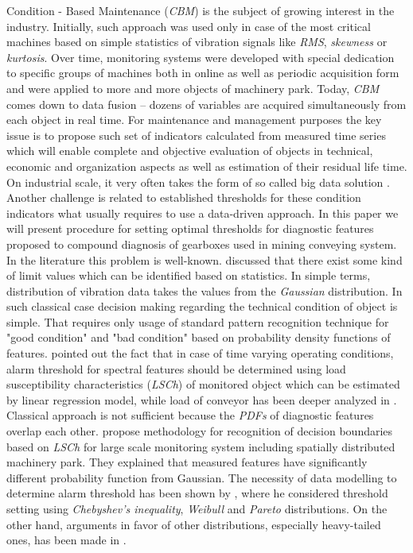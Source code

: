 \documentclass[10pt]{article}
\begin{document}
Condition - Based Maintenance (\textit{CBM}) is the subject of growing interest in the industry. Initially, such approach was used only in case of the most critical machines based on simple statistics of vibration signals like \textit{RMS}, \textit{skewness} or \textit{kurtosis}. Over time, monitoring systems were developed with special dedication to specific groups of machines both in online as well as periodic acquisition form and were applied to more and more objects of machinery park. Today, \textit{CBM} comes down to data fusion -- dozens of variables are acquired simultaneously from each object in real time. For maintenance and management purposes the key issue is to propose such set of indicators calculated from measured time series which will enable complete and objective evaluation of objects in technical, economic and organization aspects as well as estimation of their residual life time. On industrial scale, it very often takes the form of so called big data solution \cite{bartkowiak2014dimensionality}. Another challenge is related to established thresholds for these condition indicators what usually requires to use a data-driven approach. In this paper we will present procedure for setting optimal thresholds for diagnostic features proposed to compound diagnosis of gearboxes used in mining conveying system. In the literature this problem is well-known. \cite{marhadi2013simple} discussed that there exist some kind of limit values which can be identified based on statistics. In simple terms, distribution of vibration data takes the values from the \textit{Gaussian} distribution. In such classical case decision making regarding the technical condition of object is simple. That requires only usage of standard pattern recognition technique for "good condition" and "bad condition" based on probability density functions of features. \cite{zimroz2014diagnostics} pointed out the fact that in case of time varying operating conditions, alarm threshold for spectral features should be determined using load susceptibility characteristics (\textit{LSCh}) of monitored object which can be estimated by linear regression model, while load of conveyor has been deeper analyzed in \cite{krol2017testing}. Classical approach is not sufficient because the \textit{PDFs} of diagnostic features overlap each other. \cite{jablonski2013modeling, stefaniak2016diagnostic,stefaniak2015procedures} propose methodology for recognition of decision boundaries based on \textit{LSCh} for large scale monitoring system including spatially distributed machinery park. They explained that measured features have significantly different probability function from Gaussian. The necessity of data modelling to determine alarm threshold has been shown by \cite{cempel1990limit}, where he considered threshold setting using \textit{Chebyshev's inequality}, \textit{Weibull} and \textit{Pareto} distributions. On the other hand, arguments in favor of other distributions, especially heavy-tailed ones, has been made in \cite{wylomanska2016application}.
\end{document}
